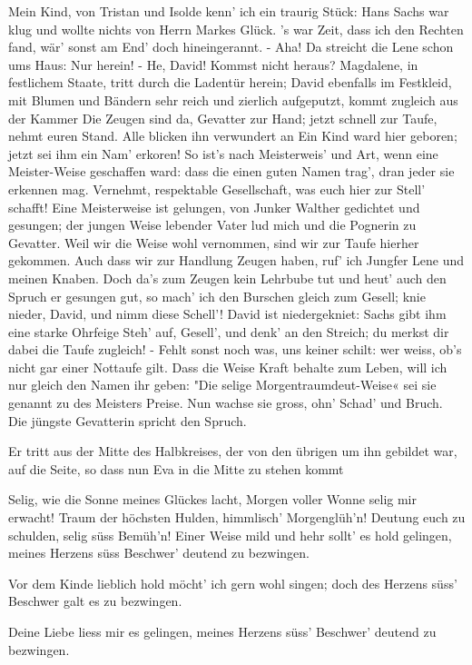 \begin{drama}
\Sachsspeaks
Mein Kind, von Tristan und Isolde
kenn' ich ein traurig Stück:
Hans Sachs war klug und wollte
nichts von Herrn Markes Glück.
's war Zeit, dass ich den Rechten fand,
wär' sonst am End' doch hineingerannt. -
Aha! Da streicht die Lene schon ums Haus:
Nur herein! - He, David! Kommst nicht heraus?
Magdalene, in festlichem Staate, tritt durch die Ladentür herein; David ebenfalls im Festkleid, mit Blumen und Bändern sehr reich und zierlich aufgeputzt, kommt zugleich aus der Kammer
Die Zeugen sind da, Gevatter zur Hand;
jetzt schnell zur Taufe, nehmt euren Stand.
Alle blicken ihn verwundert an
Ein Kind ward hier geboren;
jetzt sei ihm ein Nam' erkoren!
So ist's nach Meisterweis' und Art,
wenn eine Meister-Weise geschaffen ward:
dass die einen guten Namen trag',
dran jeder sie erkennen mag.
Vernehmt, respektable Gesellschaft,
was euch hier zur Stell' schafft!
Eine Meisterweise ist gelungen,
von Junker Walther gedichtet und gesungen;
der jungen Weise lebender Vater
lud mich und die Pognerin zu Gevatter.
Weil wir die Weise wohl vernommen,
sind wir zur Taufe hierher gekommen.
Auch dass wir zur Handlung Zeugen haben,
ruf' ich Jungfer Lene und meinen Knaben.
Doch da's zum Zeugen kein Lehrbube tut
und heut' auch den Spruch er gesungen gut,
so mach' ich den Burschen gleich zum Gesell;
knie nieder, David, und nimm diese Schell'!
David ist niedergekniet: Sachs gibt ihm eine starke Ohrfeige
Steh' auf, Gesell', und denk' an den Streich;
du merkst dir dabei die Taufe zugleich! -
Fehlt sonst noch was, uns keiner schilt:
wer weiss, ob's nicht gar einer Nottaufe gilt.
Dass die Weise Kraft behalte zum Leben,
will ich nur gleich den Namen ihr geben:
"Die selige Morgentraumdeut-Weise«
sei sie genannt zu des Meisters Preise.
Nun wachse sie gross, ohn' Schad' und Bruch.
Die jüngste Gevatterin spricht den Spruch.

Er tritt aus der Mitte des Halbkreises, der von den übrigen um ihn gebildet war, auf die Seite, so dass nun Eva in die Mitte zu stehen kommt

\Evaspeaks
Selig, wie die Sonne
meines Glückes lacht,
Morgen voller Wonne
selig mir erwacht!
Traum der höchsten Hulden,
himmlisch' Morgenglüh'n!
Deutung euch zu schulden,
selig süss Bemüh'n!
Einer Weise mild und hehr
sollt' es hold gelingen,
meines Herzens süss Beschwer'
deutend zu bezwingen.

\Sachsspeaks
Vor dem Kinde lieblich hold
möcht' ich gern wohl singen;
doch des Herzens süss' Beschwer
galt es zu bezwingen.

\Waltherspeaks
Deine Liebe liess mir es gelingen,
meines Herzens süss' Beschwer' deutend zu bezwingen.


\end{drama}
